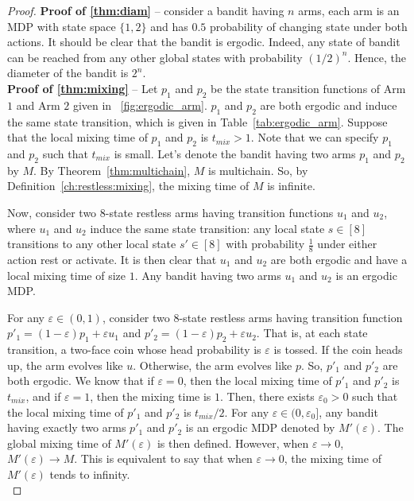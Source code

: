 \begin{proof}
    \textbf{Proof of \ref{thm:diam}} -- consider a bandit having $n$ arms, each arm is an MDP with state space $\{1,2\}$ and has $0.5$ probability of changing state under both actions.
    It should be clear that the bandit is ergodic.
    Indeed, any state of bandit can be reached from any other global states with probability $(1/2)^n$.
    Hence, the diameter of the bandit is $2^n$.
    \medskip \\

    \textbf{Proof of \ref{thm:mixing}} -- Let $p_1$ and $p_2$ be the state transition functions of Arm $1$ and Arm $2$ given in \figurename~\ref{fig:ergodic_arm}.
    $p_1$ and $p_2$ are both ergodic and induce the same state transition, which is given in Table~\ref{tab:ergodic_arm}.
    Suppose that the local mixing time of $p_1$ and $p_2$ is $t_{mix}>1$.
    Note that we can specify $p_1$ and $p_2$ such that $t_{mix}$ is small.
    Let's denote the bandit having two arms $p_1$ and $p_2$ by $M$.
    By Theorem~\ref{thm:multichain}, $M$ is multichain.
    So, by Definition~\ref{ch:restless:mixing}, the mixing time of $M$ is infinite.

    Now, consider two 8-state restless arms having transition functions $u_1$ and $u_2$, where $u_1$ and $u_2$ induce the same state transition: any local state $s\in[8]$ transitions to any other local state $s'\in[8]$ with probability $\frac18$ under either action rest or activate.
    It is then clear that $u_1$ and $u_2$ are both ergodic and have a local mixing time of size $1$.
    Any bandit having two arms $u_1$ and $u_2$ is an ergodic MDP.

    For any $\varepsilon\in(0,1)$, consider two 8-state restless arms having transition function $p'_1=(1-\varepsilon)p_1+\varepsilon u_1$ and $p'_2=(1-\varepsilon)p_2+\varepsilon u_2$.
    That is, at each state transition, a two-face coin whose head probability is $\varepsilon$ is tossed.
    If the coin heads up, the arm evolves like $u$.
    Otherwise, the arm evolves like $p$.
    So, $p'_1$ and $p'_2$ are both ergodic.
    We know that if $\varepsilon=0$, then the local mixing time of $p'_1$ and $p'_2$ is $t_{mix}$, and if $\varepsilon=1$, then the mixing time is $1$.
    Then, there exists $\varepsilon_0>0$ such that the local mixing time of $p'_1$ and $p'_2$ is $t_{mix}/2$.
    For any $\varepsilon\in(0,\varepsilon_0]$, any bandit having exactly two arms $p'_1$ and $p'_2$ is an ergodic MDP denoted by $M'(\varepsilon)$.
    The global mixing time of $M'(\varepsilon)$ is then defined.
    However, when $\varepsilon\to0$, $M'(\varepsilon)\to M$.
    This is equivalent to say that when $\varepsilon\to0$, the mixing time of $M'(\varepsilon)$ tends to infinity.
    \medskip \\


\end{proof}
